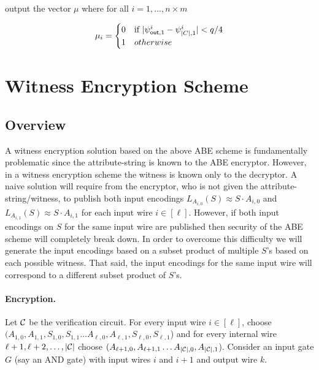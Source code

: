 {output the vector $\mu$ where for all $i = 1,\ldots,n\times m$ 

    
    \begin{align*}\mu_i = \begin{cases} 0 & \text{if } |\psi_{\out,1}^i-\psi_{|C|,1}^i|<q/4 \\
                        1                                & otherwise     %
        \end{cases}\end{align*}


\EI
}

\newpage

\section{Witness Encryption Scheme}
\subsection{Overview}

A witness encryption solution based on the above ABE scheme is fundamentally problematic since the attribute-string is known to the ABE encryptor. However, in a witness encryption scheme the witness is known only to the decryptor. A naive solution will require from the encryptor, who is not given the attribute-string/witness, to publish both input encodings $L_{A_{i,0}}(S)\approx S\cdot A_{i,0}$ and $L_{A_{i,1}}(S)\approx S\cdot A_{i,1}$ for each input wire $i\in[\ell]$. However, if both input encodings on $S$ for the same input wire are published then security of the ABE scheme will completely break down. In order to overcome this difficulty we will generate the input encodings based on a subset product of multiple $S$'s based on each possible witness. That said, the input encodings for the same input wire will correspond to a different subset product of $S$'s. 




\paragraph{Encryption.} Let ${\cal C}$ be the verification circuit. For every input wire $i\in[\ell]$, choose $(A_{1,0},A_{1,1},S_{1,0},S_{1,1}\ldots A_{\ell,0},A_{\ell,1},S_{\ell,0},S_{\ell,1}$) and for every internal wire $\ell+1,\ell+2,\ldots,|{\cal C}|$ choose $(A_{\ell+1,0},A_{\ell+1,1}\ldots A_{|{\cal C}|,0},A_{|{\cal C}|,1}$).
Consider an input gate $G$ (say an AND gate) with input wires $i$ and $i+1$ and output wire $k$. 


